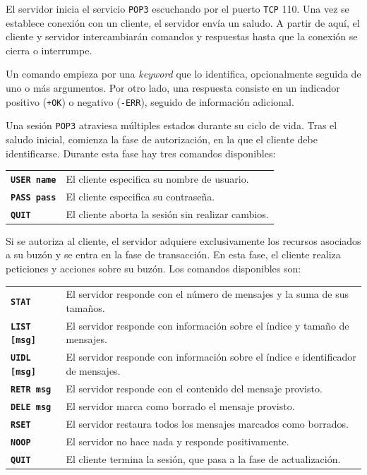 \documentclass[a4paper]{CSMakotoTechnicalReport}
\begin{document}
El servidor inicia el servicio \texttt{POP3} escuchando por el puerto \texttt{TCP} 110. Una vez se establece conexión con un cliente, el servidor envía un saludo. A partir de aquí, el cliente y servidor intercambiarán comandos y respuestas hasta que la conexión se cierra o interrumpe.

Un comando empieza por una \textit{keyword} que lo identifica, opcionalmente seguida de uno o más argumentos. Por otro lado, una respuesta consiste en un indicador positivo (\texttt{+OK}) o negativo (\texttt{-ERR}), seguido de información adicional.

Una sesión \texttt{POP3} atraviesa múltiples estados durante su ciclo de vida. Tras el saludo inicial, comienza la fase de autorización, en la que el cliente debe identificarse. Durante esta fase hay tres comandos disponibles:

\begin{tabular}{ll}
    \texttt{\textbf{USER name}} & El cliente especifica su nombre de usuario.       \\
    \texttt{\textbf{PASS pass}} & El cliente especifica su contraseña.              \\
    \texttt{\textbf{QUIT}}      & El cliente aborta la sesión sin realizar cambios. \\
\end{tabular}

Si se autoriza al cliente, el servidor adquiere exclusivamente los recursos asociados a su buzón y se entra en la fase de transacción. En esta fase, el cliente realiza peticiones y acciones sobre su buzón. Los comandos disponibles son:

\begin{tabular}{ll}
    \texttt{\textbf{STAT}}          & El servidor responde con el número de mensajes y la suma de sus tamaños.          \\
    \texttt{\textbf{LIST [msg]}}    & El servidor responde con información sobre el índice y tamaño de mensajes.        \\
    \texttt{\textbf{UIDL [msg]}}    & El servidor responde con información sobre el índice e identificador de mensajes. \\
    \texttt{\textbf{RETR msg}}      & El servidor responde con el contenido del mensaje provisto.                      \\
    \texttt{\textbf{DELE msg}}      & El servidor marca como borrado el mensaje provisto.                               \\
    \texttt{\textbf{RSET}}          & El servidor restaura todos los mensajes marcados como borrados.                   \\
    \texttt{\textbf{NOOP}}          & El servidor no hace nada y responde positivamente.                                \\
    \texttt{\textbf{QUIT}}          & El cliente termina la sesión, que pasa a la fase de actualización.                \\
\end{tabular}
\end{document}
